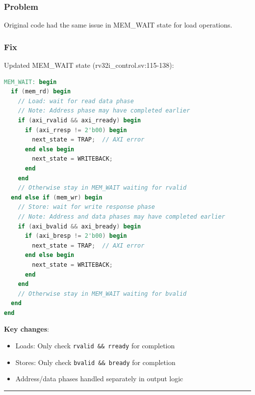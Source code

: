 \subsubsection{Problem}\label{cr:fix:critical-fixes:problem-1}

\begin{record}

Original code had the same issue in MEM\_WAIT state for load operations.

\end{record}

\subsubsection{Fix}\label{cr:fix:critical-fixes:fix-1}

\begin{record}

Updated MEM\_WAIT state (rv32i\_\allowbreak{}control.sv:115-138):

\begin{lstlisting}[language=Verilog]
MEM_WAIT: begin
  if (mem_rd) begin
    // Load: wait for read data phase
    // Note: Address phase may have completed earlier
    if (axi_rvalid && axi_rready) begin
      if (axi_rresp != 2'b00) begin
        next_state = TRAP;  // AXI error
      end else begin
        next_state = WRITEBACK;
      end
    end
    // Otherwise stay in MEM_WAIT waiting for rvalid
  end else if (mem_wr) begin
    // Store: wait for write response phase
    // Note: Address and data phases may have completed earlier
    if (axi_bvalid && axi_bready) begin
      if (axi_bresp != 2'b00) begin
        next_state = TRAP;  // AXI error
      end else begin
        next_state = WRITEBACK;
      end
    end
    // Otherwise stay in MEM_WAIT waiting for bvalid
  end
end
\end{lstlisting}

\textbf{Key changes}:

\begin{itemize}
\tightlist
\item
  \ok{} Loads: Only check \texttt{rvalid\ \&\&\ rready} for completion
\item
  \ok{} Stores: Only check \texttt{bvalid\ \&\&\ bready} for completion
\item
  \ok{} Address/\allowbreak{}data phases handled separately in output
  logic
\end{itemize}

\begin{center}\rule{0.5\linewidth}{0.5pt}\end{center}

\end{record}

